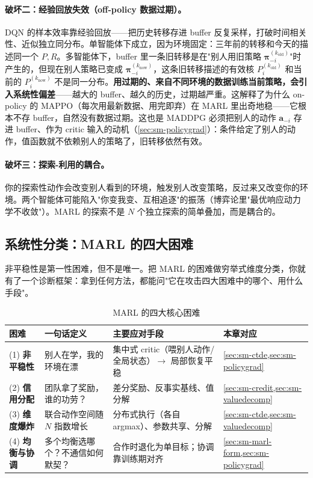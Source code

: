 \paragraph{破坏二：经验回放失效（off-policy 数据过期）。}
DQN 的样本效率靠经验回放——把历史转移存进 buffer 反复采样，打破时间相关性、近似独立同分布。单智能体下成立，因为环境固定：三年前的转移和今天的描述同一个 $P,R$。多智能体下，buffer 里一条旧转移是在"别人用旧策略 $\boldsymbol{\pi}_{-i}^{(k_{\text{old}})}$"时产生的，但现在别人策略已变成 $\boldsymbol{\pi}_{-i}^{(k_{\text{now}})}$，这条旧转移描述的有效核 $P_i^{(k_{\text{old}})}$ 和当前的 $P_i^{(k_{\text{now}})}$ 不是同一分布。\textbf{用过期的、来自不同环境的数据训练当前策略，会引入系统性偏差}——越大的 buffer、越久的历史，过期越严重。这解释了为什么 on-policy 的 MAPPO（每次用最新数据、用完即弃）在 MARL 里出奇地稳——它根本不存 buffer，自然没有数据过期。这也是 MADDPG 必须把别人的动作 $\mathbf{a}_{-i}$ 存进 buffer、作为 critic 输入的动机（\cref{sec:sm-policygrad}）：条件给定了别人的动作，值函数就不依赖别人的策略了，旧转移依然有效。

\paragraph{破坏三：探索-利用的耦合。}
你的探索性动作会改变别人看到的环境，触发别人改变策略，反过来又改变你的环境。两个智能体可能陷入"你变我变、互相追逐"的振荡（博弈论里"最优响应动力学不收敛"）。MARL 的探索不是 $N$ 个独立探索的简单叠加，而是耦合的。

\subsection{系统性分类：MARL 的四大困难}
\label{sec:sm-four-difficulties}

非平稳性是第一性困难，但不是唯一。把 MARL 的困难做穷举式维度分类，你就有了一个诊断框架：拿到任何方法，都能问"它在攻击四大困难中的哪个、用什么手段"。

\begin{table}[H]\centering\small
\caption{MARL 的四大核心困难}
\label{tab:sm-four-diff}
\begin{tabular}{p{} p{} p{} p{}}
\toprule
困难 & 一句话定义 & 主要应对手段 & 本章对应 \\
\midrule
(1) \textbf{非平稳性} & 别人在学，我的环境在漂 & 集中式 critic（喂别人动作/全局状态）$\to$ 局部恢复平稳 & \cref{sec:sm-ctde,sec:sm-policygrad} \\
(2) \textbf{信用分配} & 团队拿了奖励，谁的功劳？ & 差分奖励、反事实基线、值分解 & \cref{sec:sm-credit,sec:sm-valuedecomp} \\
(3) \textbf{维度爆炸} & 联合动作空间随 $N$ 指数增长 & 分布式执行（各自 argmax）、参数共享、分解 & \cref{sec:sm-ctde,sec:sm-valuedecomp} \\
(4) \textbf{均衡与协调} & 多个均衡选哪个？不通信如何默契？ & 合作时退化为单目标；协调靠训练期对齐 & \cref{sec:sm-marl-form,sec:sm-policygrad} \\
\bottomrule
\end{tabular}
\end{table}


